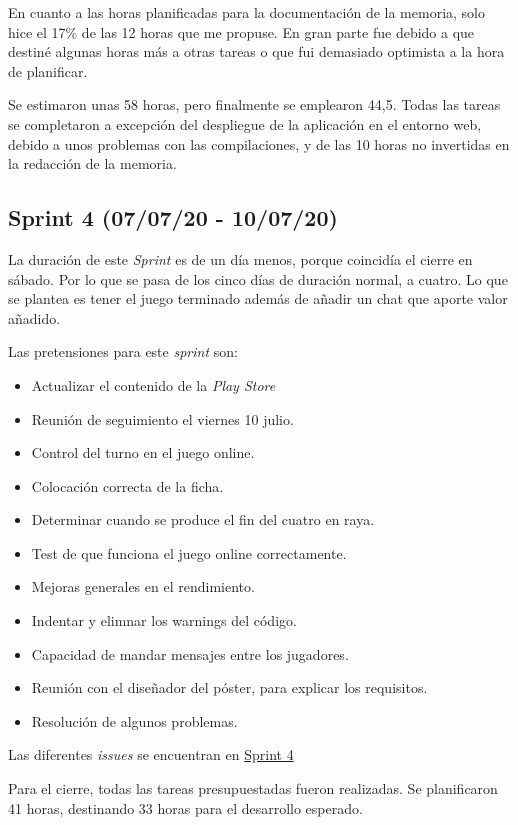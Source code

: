 En cuanto a las horas planificadas para la documentación de la memoria, solo hice el 17\% de las 12 horas que me propuse. En gran parte fue debido a que destiné algunas horas más a otras tareas o que fui demasiado optimista a la hora de planificar.

Se estimaron unas 58 horas, pero finalmente se emplearon 44,5. Todas las tareas se completaron a excepción del despliegue de la aplicación en el entorno web, debido a unos problemas con las compilaciones, y de las 10 horas no invertidas en la redacción de la memoria.

\subsection{Sprint 4 (07/07/20 - 10/07/20)}\label{sprint-4-070720---100720}
La duración de este \emph{Sprint} es de un día menos, porque coincidía el cierre en sábado. Por lo que se pasa de los cinco días de duración normal, a cuatro. Lo que se plantea es tener el juego terminado además de añadir un chat que aporte valor añadido.

Las pretensiones para este \emph{sprint} son:
\begin{itemize}
	\item Actualizar el contenido de la \emph{Play Store}
	\item Reunión de seguimiento el viernes 10 julio.
	\item Control del turno en el juego online.
	\item Colocación correcta de la ficha.
	\item Determinar cuando se produce el fin del cuatro en raya.
	\item Test de que funciona el juego online correctamente.
	\item Mejoras generales en el rendimiento.
	\item Indentar y elimnar los warnings del código.
	\item Capacidad de mandar mensajes entre los jugadores.
	\item Reunión con el diseñador del póster, para explicar los requisitos.
	\item Resolución de algunos problemas.
\end{itemize}

Las diferentes \emph{issues} se encuentran en \href{https://github.com/scc0034/flutter_serpiente/milestone/4?closed=1}{Sprint 4}


Para el cierre, todas las tareas presupuestadas fueron realizadas. Se planificaron 41 horas, destinando 33 horas para el desarrollo esperado.

